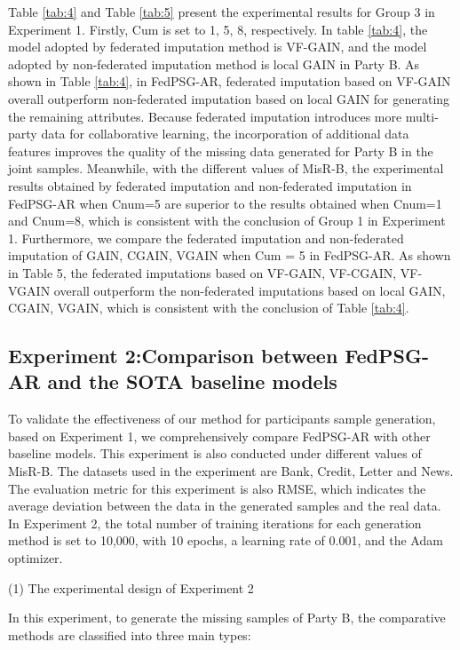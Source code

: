 \documentclass[final,1p,times]{elsarticle}
\begin{document}
Table \ref{tab:4} and Table \ref{tab:5} present the experimental results for Group 3 in Experiment 1. Firstly, Cum is set to 1, 5, 8, respectively. In table \ref{tab:4}, the model adopted by federated imputation method is VF-GAIN, and the model adopted by non-federated imputation method is local GAIN in Party B. As shown in Table \ref{tab:4}, in FedPSG-AR, federated imputation based on VF-GAIN overall outperform non-federated imputation based on local GAIN for generating the remaining attributes. Because federated imputation introduces more multi-party data for collaborative learning, the incorporation of additional data features improves the quality of the missing data generated for Party B in the joint samples. Meanwhile, with the different values of MisR-B, the experimental results obtained by federated imputation and non-federated imputation in FedPSG-AR when Cnum=5 are superior to the results obtained when Cnum=1 and Cnum=8, which is consistent with the conclusion of Group 1 in Experiment 1. Furthermore, we compare the federated imputation and non-federated imputation of GAIN, CGAIN, VGAIN when Cum = 5 in FedPSG-AR. As shown in Table 5, the federated imputations based on VF-GAIN, VF-CGAIN, VF-VGAIN overall outperform the non-federated imputations based on local GAIN, CGAIN, VGAIN, which is consistent with the conclusion of Table \ref{tab:4}. 


\subsection{Experiment 2:Comparison between FedPSG-AR and the SOTA baseline models}
\label{subsec43}

To validate the effectiveness of our method for participants sample generation, based on Experiment 1, we comprehensively compare FedPSG-AR with other baseline models. This experiment is also conducted under different values of MisR-B. The datasets used in the experiment are Bank, Credit, Letter and News. The evaluation metric for this experiment is also RMSE, which indicates the average deviation between the data in the generated samples and the real data. In Experiment 2, the total number of training iterations for each generation method is set to 10,000, with 10 epochs, a learning rate of 0.001, and the Adam optimizer. 

(1) The experimental design of Experiment 2

In this experiment, to generate the missing samples of Party B, the comparative methods  are classified into three main types:
\end{document}
